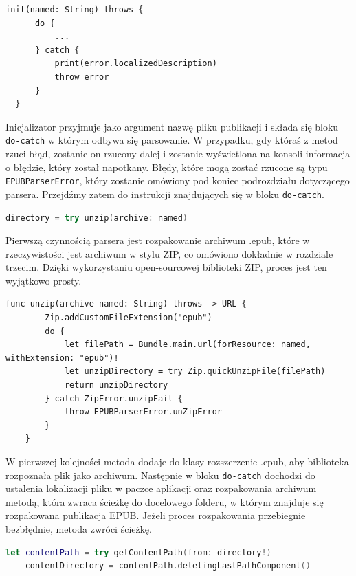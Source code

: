 \begin{lstlisting}[language=swift-reference,caption=aaaa,label=bbb]
  init(named: String) throws {
      do {
          ...
      } catch {
          print(error.localizedDescription)
          throw error
      }
  }
\end{lstlisting}

Inicjalizator przyjmuje jako argument nazwę pliku publikacji i składa się bloku \texttt{do-catch} w którym odbywa się parsowanie. W przypadku, gdy któraś z metod rzuci błąd, zostanie on rzucony dalej i zostanie wyświetlona na konsoli informacja o błędzie, który został napotkany. Błędy, które mogą zostać rzucone są typu \texttt{EPUBParserError}, który zostanie omówiony pod koniec podrozdziału dotyczącego parsera. Przejdźmy zatem do instrukcji znajdujących się w bloku \texttt{do-catch}.

\begin{lstlisting}[firstnumber=11, language=swift]
directory = try unzip(archive: named)
\end{lstlisting}

Pierwszą czynnością parsera jest rozpakowanie archiwum .epub, które w rzeczywistości jest archiwum w stylu ZIP, co omówiono dokładnie w rozdziale trzecim. Dzięki wykorzystaniu open-sourcowej biblioteki ZIP, proces jest ten wyjątkowo prosty.

\begin{lstlisting}[caption={Implementacja metody unzip (archive named:)},language=swift-reference]
    func unzip(archive named: String) throws -> URL {
        Zip.addCustomFileExtension("epub")
        do {
            let filePath = Bundle.main.url(forResource: named, withExtension: "epub")!
            let unzipDirectory = try Zip.quickUnzipFile(filePath)
            return unzipDirectory
        } catch ZipError.unzipFail {
            throw EPUBParserError.unZipError
        }
    }
\end{lstlisting}

W pierwszej kolejności metoda dodaje do klasy  rozszerzenie .epub, aby biblioteka rozpoznała plik jako archiwum. Następnie w bloku \texttt{do-catch} dochodzi do ustalenia lokalizacji pliku w paczce aplikacji oraz rozpakowania archiwum metodą, która zwraca ścieżkę do docelowego folderu, w którym znajduje się rozpakowana publikacja EPUB. Jeżeli proces rozpakowania przebiegnie bezbłędnie, metoda zwróci ścieżkę.

\begin{lstlisting}[firstnumber=12, language=swift]
    let contentPath = try getContentPath(from: directory!)
    contentDirectory = contentPath.deletingLastPathComponent()
\end{lstlisting}


